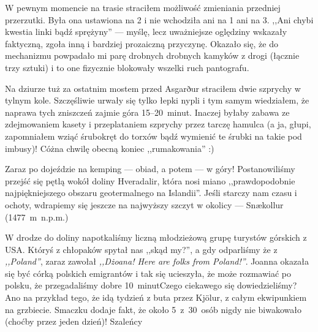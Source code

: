 W pewnym momencie na trasie straciłem możliwość zmieniania przedniej przerzutki. Była ona ustawiona na 2 i nie wchodziła ani na 1 ani na 3. ,,Ani chybi kwestia linki bądź sprężyny'' --- myślę, lecz uważniejsze oględziny wskazały faktyczną, zgoła inną i bardziej prozaiczną przyczynę. Okazało się, że do mechanizmu powpadało mi parę drobnych drobnych kamyków z drogi (łącznie trzy sztuki) i to one fizycznie blokowały wszelki ruch pantografu.

Na dziurze tuż za ostatnim mostem przed Asgarður straciłem dwie szprychy w tylnym kole. Szczęśliwie urwały się tylko łepki nypli i tym samym wiedziałem, że naprawa tych zniszczeń zajmie góra 15--20~minut. Inaczej byłaby zabawa ze zdejmowaniem kasety i przeplataniem szprychy przez tarczę hamulca (a ja, głupi, zapomniałem wziąć śrubokręt do torxów bądź wymienić te śrubki na takie pod imbusy)! Cóż\textellipsis na chwilę obecną koniec ,,rumakowania'' :)


Zaraz po dojeździe na kemping --- obiad, a potem --- w góry! Postanowiliśmy przejść się pętlą wokół doliny Hveradalir, która nosi miano ,,prawdopodobnie najpiękniejszego obszaru geotermalnego na Islandii''. Jeśli starczy nam czasu i ochoty, wdrapiemy się jeszcze na najwyższy szczyt w okolicy --- Snækollur (1477~m~n.p.m.)

W drodze do doliny napotkaliśmy liczną młodzieżową grupę turystów górskich z USA. Któryś z chłopaków spytał nas ,,skąd my?'', a gdy odparliśmy że z \emph{,,Poland''}, zaraz zawołał \emph{,,Dżoana! Here are folks from Poland!''}. Joanna okazała się być córką polskich emigrantów i tak się ucieszyła, że może rozmawiać po polsku, że przegadaliśmy dobre 10~minut\textellipsis Czego ciekawego się dowiedzieliśmy? Ano na przykład tego, że idą tydzień z buta przez Kjölur, z całym ekwipunkiem na grzbiecie. Smaczku dodaje fakt, że około 5~z~30~osób nigdy nie biwakowało (choćby przez jeden dzień)! Szaleńcy\textellipsis


